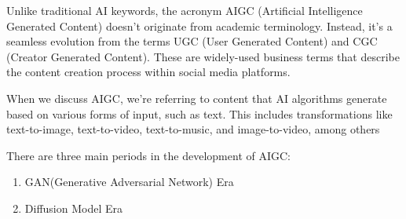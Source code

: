 Unlike traditional AI keywords, 
the acronym AIGC (Artificial Intelligence Generated Content) doesn't originate from academic terminology. 
Instead, it's a seamless evolution from the terms UGC (User Generated Content) and CGC (Creator Generated Content). 
These are widely-used business terms that describe the content creation process 
within social media platforms.

When we discuss AIGC, we're referring to content that AI algorithms 
generate based on various forms of input, such as text. 
This includes transformations like text-to-image, 
text-to-video, text-to-music, and image-to-video, among others

There are three main periods in the development of AIGC:

\begin{enumerate}
    \item GAN(Generative Adversarial Network) Era
    \item Diffusion Model Era
\end{enumerate}

